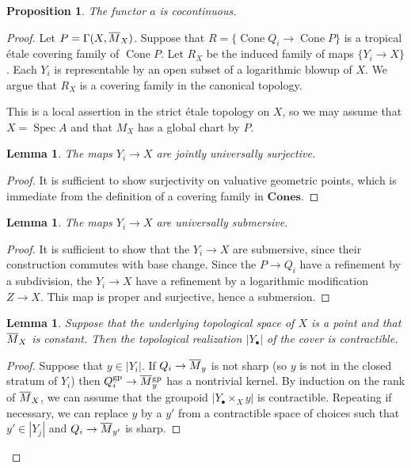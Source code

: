 \documentclass[12pt]{amsart}
\newtheorem{proposition}[theorem]{Proposition}
\newtheorem{lemma}[theorem]{Lemma}
\theoremstyle{definition}
\theoremstyle{remark}
\def\Cone{\operatorname{Cone}}
\def\Spec{\operatorname{Spec}}
\def\Cones{\mathbf{Cones}}
\def\overnorm#1{\overline{#1}\vphantom{#1}}
\begin{document}
\begin{proposition}
The functor $a$ is cocontinuous.
\end{proposition}
\begin{proof}
Let $P = \Gamma(X, \overnorm M_X)$.  Suppose that $R = \{ \Cone Q_i \to \Cone P \}$ is a tropical \'etale covering family of $\Cone P$.  Let $R_X$ be the induced family of maps $\{ Y_i \to X \}$.  Each $Y_i$ is representable by an open subset of a logarithmic blowup of $X$.  We argue that $R_X$ is a covering family in the canonical topology.

This is a local assertion in the strict \'etale topology on $X$, so we may assume that $X = \Spec A$ and that $M_X$ has a global chart by $P$.

\begin{lemma} \label{lem:surjective}
The maps $Y_i \to X$ are jointly universally surjective.
\end{lemma}
\begin{proof}
It is sufficient to show surjectivity on valuative geometric points, which is immediate from the definition of a covering family in $\Cones$.
\end{proof}

\begin{lemma} \label{lem:submersive}
The maps $Y_i \to X$ are universally submersive.
\end{lemma}
\begin{proof}
It is sufficient to show that the $Y_i \to X$ are submersive, since their construction commutes with base change.  Since the $P \to Q_i$ have a refinement by a subdivision, the $Y_i \to X$ have a refinement by a logarithmic modification $Z \to X$.  This map is proper and surjective, hence a submersion.
\end{proof}

\begin{lemma} \label{lem:top-gpd}
Suppose that the underlying topological space of $X$ is a point and that $\overnorm M_X$ is constant.  Then the topological realization $|Y_\bullet|$ of the cover is contractible.
\end{lemma}
\begin{proof}
Suppose that $y \in |Y_i|$.  If $Q_i \to \overnorm M_y$ is not sharp (so $y$ is not in the closed stratum of $Y_i$) then $Q_i^{\rm gp} \to \overnorm M_y^{\rm gp}$ has a nontrivial kernel.  By induction on the rank of $\overnorm M_X$, we can assume that the groupoid $|Y_\bullet \mathop\times_X y|$ is contractible.  Repeating if necessary, we can replace $y$ by a $y'$ from a contractible space of choices such that $y' \in |Y_j|$ and $Q_i \to \overnorm M_{y'}$ is sharp.


\end{proof}
\end{proof}
\end{document}
